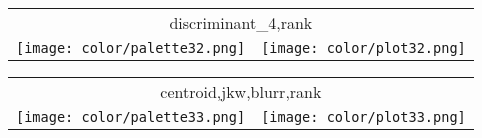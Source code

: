 \documentclass{article}
\begin{document}
\begin{center}
\begin{tabular}{m{8cm}m{8cm}}
\multicolumn{2}{c}{discriminant\_4,rank} \\
\texttt{[image: color/palette32.png]} &
\texttt{[image: color/plot32.png]}
\end{tabular}
\end{center}

\begin{center}
\begin{tabular}{m{8cm}m{8cm}}
\multicolumn{2}{c}{centroid,jkw,blurr,rank} \\
\texttt{[image: color/palette33.png]} &
\texttt{[image: color/plot33.png]}
\end{tabular}
\end{center}
\end{document}
